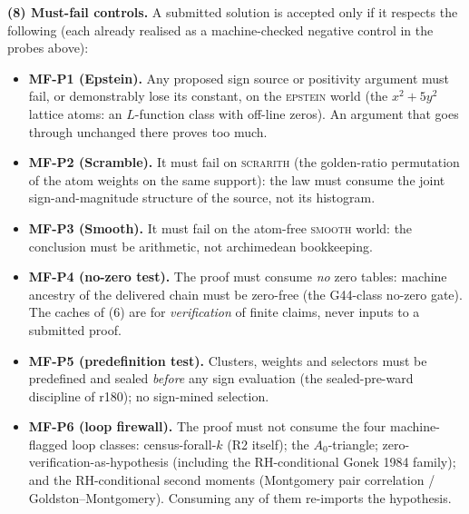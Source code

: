 \documentclass[11pt,a4paper]{article}
\begin{document}
\par\smallskip\noindent\textbf{(8) Must-fail controls.}  A submitted solution is accepted only
if it respects the following (each already realised as a machine-checked negative control in
the probes above):
\begin{itemize}
\item \textbf{MF-P1 (Epstein).}  Any proposed sign source or positivity argument must fail, or
  demonstrably lose its constant, on the \textsc{epstein} world (the $x^2 + 5y^2$ lattice
  atoms: an $L$-function class with off-line zeros).  An argument that goes through unchanged
  there proves too much.
\item \textbf{MF-P2 (Scramble).}  It must fail on \textsc{scrarith} (the golden-ratio
  permutation of the atom weights on the same support): the law must consume the joint
  sign-and-magnitude structure of the source, not its histogram.
\item \textbf{MF-P3 (Smooth).}  It must fail on the atom-free \textsc{smooth} world: the
  conclusion must be arithmetic, not archimedean bookkeeping.
\item \textbf{MF-P4 (no-zero test).}  The proof must consume \emph{no} zero tables: machine
  ancestry of the delivered chain must be zero-free (the G44-class no-zero gate).  The caches
  of (6) are for \emph{verification} of finite claims, never inputs to a submitted proof.
\item \textbf{MF-P5 (predefinition test).}  Clusters, weights and selectors must be predefined
  and sealed \emph{before} any sign evaluation (the sealed-pre-ward discipline of r180); no
  sign-mined selection.
\item \textbf{MF-P6 (loop firewall).}  The proof must not consume the four machine-flagged
  loop classes: census-forall-$k$ (R2 itself); the $A_0$-triangle; zero-verification-as-hypothesis
  (including the RH-conditional Gonek 1984 family); and the RH-conditional second moments
  (Montgomery pair correlation / Goldston--Montgomery).  Consuming any of them re-imports the
  hypothesis.
\end{itemize}
\end{document}

